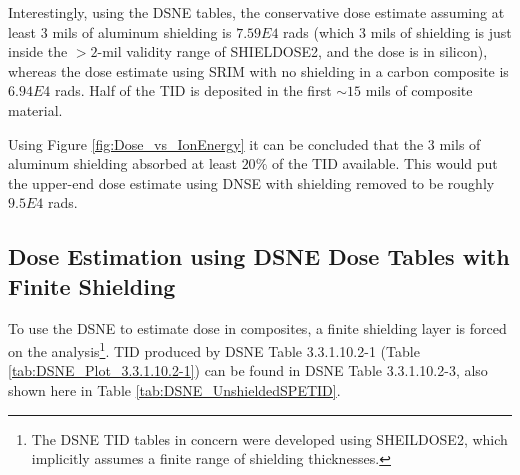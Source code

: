 \documentclass{hitec}
\begin{document}
Interestingly, using the DSNE tables, the conservative dose estimate assuming at least 3 mils of aluminum shielding is $7.59E4$ rads (which $3$ mils of shielding is just inside the $>2$-mil validity range of SHIELDOSE2, and the dose is in silicon), whereas the dose estimate using SRIM with no shielding in a carbon composite is $6.94E4$ rads. Half of the TID is deposited in the first $\sim15$ mils of composite material.

Using Figure \ref{fig:Dose_vs_IonEnergy} it can be concluded that the $3$ mils of aluminum shielding absorbed at least $20\%$ of the TID available. This would put the upper-end dose estimate using DNSE with shielding removed to be roughly $9.5E4$ rads.

\subsection[using DSNE Dose Tables]{Dose Estimation using DSNE Dose Tables with Finite Shielding}\label{ssec:DSNEwithShielding}

To use the DSNE to estimate dose in composites, a finite shielding layer is forced on the analysis\footnote{The DSNE TID tables in concern were developed using SHEILDOSE2, which implicitly assumes a finite range of shielding thicknesses.}. TID produced by DSNE Table 3.3.1.10.2-1 (Table \ref{tab:DSNE_Plot_3.3.1.10.2-1}) can be found in DSNE Table 3.3.1.10.2-3, also shown here in Table \ref{tab:DSNE_UnshieldedSPETID}.

\end{document}

